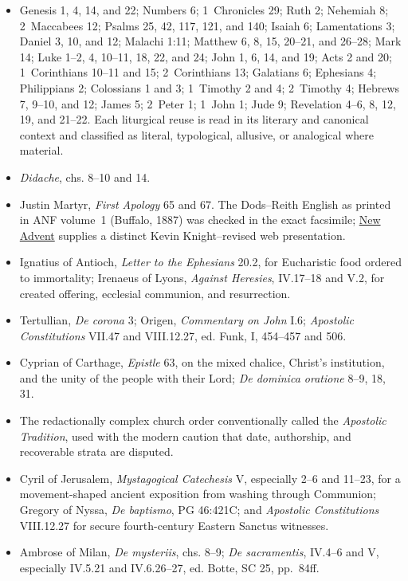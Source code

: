 \begin{itemize}
  \item Genesis 1, 4, 14, and 22; Numbers 6; 1~Chronicles 29; Ruth 2; Nehemiah 8; 2~Maccabees 12; Psalms 25, 42, 117, 121, and 140; Isaiah 6; Lamentations 3; Daniel 3, 10, and 12; Malachi 1:11; Matthew 6, 8, 15, 20--21, and 26--28; Mark 14; Luke 1--2, 4, 10--11, 18, 22, and 24; John 1, 6, 14, and 19; Acts 2 and 20; 1~Corinthians 10--11 and 15; 2~Corinthians 13; Galatians 6; Ephesians 4; Philippians 2; Colossians 1 and 3; 1~Timothy 2 and 4; 2~Timothy 4; Hebrews 7, 9--10, and 12; James 5; 2~Peter 1; 1~John 1; Jude 9; Revelation 4--6, 8, 12, 19, and 21--22. Each liturgical reuse is read in its literary and canonical context and classified as literal, typological, allusive, or analogical where material.
  \item \emph{Didache}, chs. 8--10 and 14.
  \item Justin Martyr, \emph{First Apology} 65 and 67. The Dods--Reith English as printed in ANF volume~1 (Buffalo, 1887) was checked in the exact facsimile; \href{https://www.newadvent.org/fathers/0126.htm}{New Advent} supplies a distinct Kevin Knight--revised web presentation.
  \item Ignatius of Antioch, \emph{Letter to the Ephesians} 20.2, for Eucharistic food ordered to immortality; Irenaeus of Lyons, \emph{Against Heresies}, IV.17--18 and V.2, for created offering, ecclesial communion, and resurrection.
  \item Tertullian, \emph{De corona} 3; Origen, \emph{Commentary on John} I.6; \emph{Apostolic Constitutions} VII.47 and VIII.12.27, ed. Funk, I, 454--457 and 506.
  \item Cyprian of Carthage, \emph{Epistle} 63, on the mixed chalice, Christ's institution, and the unity of the people with their Lord; \emph{De dominica oratione} 8--9, 18, 31.
  \item The redactionally complex church order conventionally called the \emph{Apostolic Tradition}, used with the modern caution that date, authorship, and recoverable strata are disputed.
  \item Cyril of Jerusalem, \emph{Mystagogical Catechesis} V, especially 2--6 and 11--23, for a movement-shaped ancient exposition from washing through Communion; Gregory of Nyssa, \emph{De baptismo}, PG 46:421C; and \emph{Apostolic Constitutions} VIII.12.27 for secure fourth-century Eastern Sanctus witnesses.
  \item Ambrose of Milan, \emph{De mysteriis}, chs. 8--9; \emph{De sacramentis}, IV.4--6 and V, especially IV.5.21 and IV.6.26--27, ed. Botte, SC 25, pp.~84ff.

\end{itemize}
